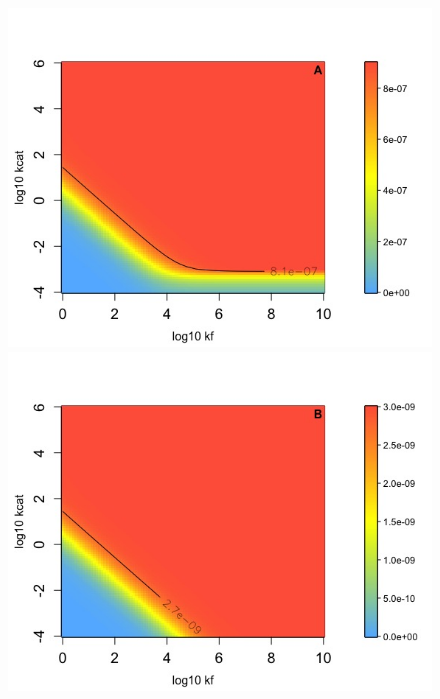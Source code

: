 \begin{figure}[htb!]
\includegraphics[scale=0.38,trim=0cm 0cm 0cm 1.5cm,clip]{pics/SM-Enzymes/Fit_Landscape2D_PD_abnormal.jpeg}
\includegraphics[scale=0.38,trim=0cm 0cm 0cm 1.5cm,clip]{pics/SM-Enzymes/Fit_Landscape2D_PD_normal.jpeg}  

\end{figure}
